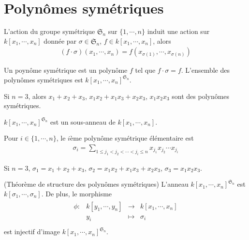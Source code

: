     \section{Polynômes symétriques}
        L'action du groupe symétrique $\mathfrak{S}_n$ sur $\{1, \cdots, n\}$ induit une action sur $k[x_1, \cdots, x_n]$ donnée par $\sigma \in \mathfrak{S}_n$, $f \in k[x_1, \cdots, x_n]$, alors 
        \begin{align*}
            (f \cdot \sigma)(x_1, \cdots, x_n) = f(x_{\sigma(1)}, \cdots, x_{\sigma(n)})
        \end{align*}
        \begin{defi}
            Un poynôme symétrique est un polynôme $f$ tel que $f \cdot \sigma = f$. L'ensemble des polynômes symétriques est $k[x_1, \cdots, x_n]^{\mathfrak{S}_n}$.
        \end{defi}
        \begin{expl}
            Si $n = 3$, alors $x_1 + x_2 + x_3$, $x_1x_2 + x_1x_3 + x_2x_3$, $x_1x_2x_3$ sont des polynômes symétriques.
        \end{expl}
        \begin{prop}
            $k[x_1, \cdots, x_n]^{\mathfrak{S}_n}$ est un sous-anneau de $k[x_1, \cdots, x_n]$.
        \end{prop}
        \begin{defi}
            Pour $i \in \{1, \cdots, n\}$, le $i$ème polynôme symétrique élémentaire est
            \begin{align*}
                \sigma_i = \sum_{1 \leq j_1 < j_2 < \cdots < j_i \leq n} x_{j_1}x_{j_2} \cdots x_{j_i}
            \end{align*}
        \end{defi}
        \begin{expl}
            Si $n = 3$, $\sigma_1 = x_1 + x_2 + x_3$, $\sigma_2 = x_1x_2 + x_1x_3 + x_2x_3$, $\sigma_3 = x_1x_2x_3$.
        \end{expl}
        \begin{theo} (Théorème de structure des polynômes symétriques)
            L'anneau $k[x_1, \cdots, x_n]^{\mathfrak{S}_n}$ est $k[\sigma_1, \cdots, \sigma_n]$. De plus, le morphisme
            \begin{align*}
                \begin{array}{cccc}
                    \phi : & k[y_1, \cdots, y_n] & \to & k[x_1, \cdots, x_n] \\
                    & y_i & \mapsto & \sigma_i \\
                \end{array}
            \end{align*}
            est injectif d'image $k[x_1, \cdots, x_n]^{\mathfrak{S}_n}$.
        \end{theo}
